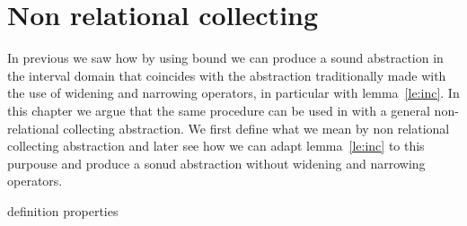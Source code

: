 \section{Non relational collecting}
\label{sec:nonrelational}

In previous we saw how by using bound we can produce a sound
abstraction in the interval domain that coincides with the abstraction
traditionally made with the use of widening and narrowing operators,
in particular with lemma~\ref{le:inc}. In this chapter we argue that
the same procedure can be used in with a general non-relational
collecting abstraction. We first define what we mean by non relational
collecting abstraction and later see how we can adapt
lemma~\ref{le:inc} to this purpouse and produce a sonud abstraction
without widening and narrowing operators.

{definition}
{properties}
